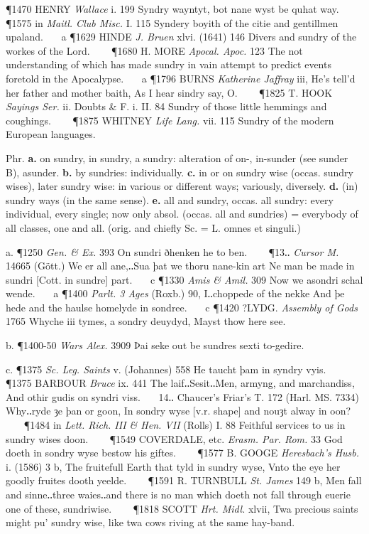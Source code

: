 \begin{description}[wide, labelwidth=!, labelindent=0pt]
\begin{myenumerate}
\P 1470 HENRY  \textit{Wallace} i. 199 Syndry wayntyt, bot nane wyst be quhat way.    
\P 1575 in  \textit{Maitl. Club Misc.} I. 115 Syndery boyith of the citie and gentillmen upaland.    a 
\P 1629 HINDE  \textit{J. Bruen} xlvi. (1641) 146 Divers and sundry of the workes of the Lord.    
\P 1680 H. MORE  \textit{Apocal. Apoc.} 123 The not understanding of which has made sundry in vain attempt to predict events foretold in the Apocalypse.    a 
\P 1796 BURNS  \textit{Katherine Jaffray} iii, He's tell'd her father and mother baith, As I hear sindry say, O.    
\P 1825 T. HOOK  \textit{Sayings Ser.} ii. Doubts \& F. i. II. 84 Sundry of those little hemmings and coughings.    
\P 1875 WHITNEY  \textit{Life Lang.} vii. 115 Sundry of the modern European languages.

 Phr. \textbf{a.} on sundry, in sundry, a sundry: alteration of on-, in-sunder (see sunder B), asunder. 
\textbf{b.} by sundries: individually. 
\textbf{c.} in or on sundry wise (occas. sundry wises), later sundry wise: in various or different ways; variously, diversely. 
\textbf{d.} (in) sundry ways (in the same sense). 
\textbf{e.} all and sundry, occas. all sundry: every individual, every single; now only absol. (occas. all and sundries) = everybody of all classes, one and all. (orig. and chiefly Sc. = L. omnes et singuli.)

a. \P 1250 \textit{Gen. \& Ex.}  393 On sundri ðhenken he to ben.    
\P 13‥ \textit{Cursor M.} 14665 (Gött.) We er all ane,‥Sua þat we thoru nane-kin art Ne man be made in sundri [Cott. in sundre] part.    c 
\P 1330 \textit{Amis \& Amil.}  309 Now we asondri schal wende.    a 
\P 1400 \textit{Parlt.  3 Ages} (Roxb.) 90, I‥choppede of the nekke And þe hede and the haulse homelyde in sondree.    c 
\P 1420 ?LYDG.  \textit{Assembly of Gods} 1765 Whyche  iii tymes, a sondry deuydyd, Mayst thow here see.

b. \P 1400-50 \textit{Wars  Alex.} 3909 Þai seke out be sundres sexti to-gedire.

c. \P 1375 \textit{Sc. Leg.  Saints} v. (Johannes) 558 He taucht þam in syndry vyis.    
\P 1375 BARBOUR  \textit{Bruce} ix. 441 The laif‥Sesit‥Men, armyng, and marchandiss, And othir gudis on syndri viss.    14‥ Chaucer's Friar's T. 172 (Harl. MS. 7334) Why‥ryde ȝe þan or goon, In sondry wyse [v.r. shape] and nouȝt alway in oon?    
\P 1484 in  \textit{Lett. Rich. III \& Hen. VII} (Rolls) I. 88 Feithful services to us in sundry wises doon.    
\P 1549 COVERDALE, etc. \textit{Erasm. Par. Rom.} 33 God doeth in sondry wyse bestow his giftes.    
\P 1577 B. GOOGE  \textit{Heresbach's Husb.} i. (1586) 3 b, The fruitefull Earth that tyld in sundry wyse, Vnto the eye her goodly fruites dooth yeelde.    
\P 1591 R. TURNBULL  \textit{St. James} 149 b, Men fall and sinne‥three waies‥and there is no man which doeth not fall through euerie one of these, sundriwise.    
\P 1818 SCOTT  \textit{Hrt. Midl.} xlvii, Twa precious saints might pu' sundry wise, like twa cows riving at the same hay-band.


\end{myenumerate}
\end{description}
